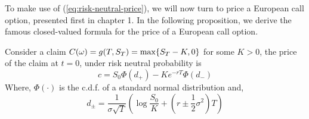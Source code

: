 \documentclass[../TGMAFFIRO.tex]{subfiles}
\begin{document}
To make use of (\ref{eq:risk-neutral-price}), we will now turn to price a European call option, presented first in chapter 1. In the following proposition, we derive the famous closed-valued formula for the price of a European call option.

\begin{proposition}
	Consider a claim $C(\omega) = g(T, S_T) = \max\{S_T - K, 0\}$ for some $K > 0$, the price of the claim at $t=0$, under risk neutral probability is
	\begin{equation}
		c = S_0 \Phi(d_+) - Ke^{-rT}\Phi(d_-)
	\end{equation}
	Where,
	$\Phi(\cdot)$ is the c.d.f. of a standard normal distribution and,
	\[
		d_\pm = \frac{1}{\sigma\sqrt{T}}\left(\log\frac{S_0}{K} + (r \pm \frac{1}{2}\sigma^2)
		T\right)
	\]
\end{proposition}
\end{document}
